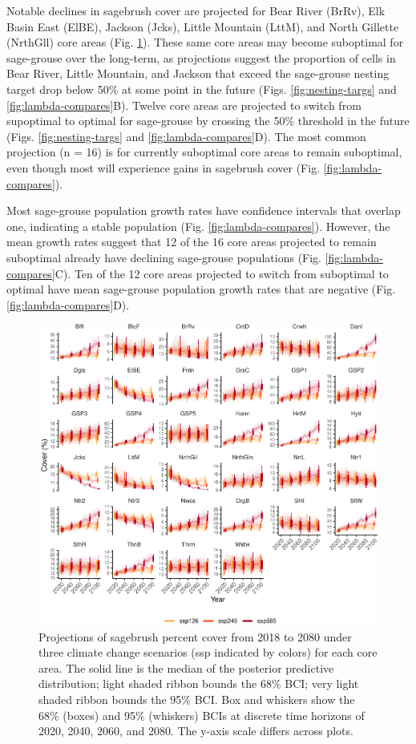 \documentclass[
  12pt,
]{article}
\begin{document}
Notable declines in sagebrush cover are projected for Bear River (BrRv), Elk Basin East (ElBE), Jackson (Jcks), Little Mountain (LttM), and North Gillette (NrthGll) core areas (Fig. \ref{fig:projections}).
These same core areas may become suboptimal for sage-grouse over the long-term, as projections suggest the proportion of cells in Bear River, Little Mountain, and Jackson that exceed the sage-grouse nesting target drop below 50\% at some point in the future (Figs. \ref{fig:nesting-targs} and \ref{fig:lambda-compares}B).
Twelve core areas are projected to switch from supoptimal to optimal for sage-grouse by crossing the 50\% threshold in the future (Figs. \ref{fig:nesting-targs} and \ref{fig:lambda-compares}D).
The most common projection (n = 16) is for currently suboptimal core areas to remain suboptimal, even though most will experience gains in sagebrush cover (Fig. \ref{fig:lambda-compares}).

Most sage-grouse population growth rates have confidence intervals that overlap one, indicating a stable population (Fig. \ref{fig:lambda-compares}).
However, the mean growth rates suggest that 12 of the 16 core areas projected to remain suboptimal already have declining sage-grouse populations (Fig. \ref{fig:lambda-compares}C).
Ten of the 12 core areas projected to switch from suboptimal to optimal have mean sage-grouse population growth rates that are negative (Fig. \ref{fig:lambda-compares}D).

\begin{figure}
\centering
\includegraphics{sageCastManuscript_files/figure-latex/projections-1.pdf}
\caption{\label{fig:projections}Projections of sagebrush percent cover from 2018 to 2080 under three climate change scenarios (ssp indicated by colors) for each core area. The solid line is the median of the posterior predictive distribution; light shaded ribbon bounds the 68\% BCI; very light shaded ribbon bounds the 95\% BCI. Box and whiskers show the 68\% (boxes) and 95\% (whiskers) BCIs at discrete time horizons of 2020, 2040, 2060, and 2080. The y-axis scale differs across plots.}
\end{figure}
\end{document}
